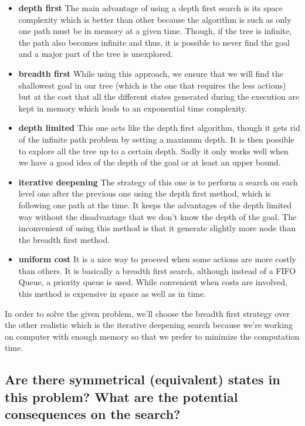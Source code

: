 \documentclass[a4paper,10pt]{article}
\begin{document}
	\begin{itemize}
		\item \textbf{depth first} The main advantage of using a depth first search is its space complexity which is better than other because the algorithm is such as only one path must be in memory at a given time. 
		Though, if the tree is infinite, the path also becomes infinite and thus, it is possible to never find the goal and a major part of the tree is unexplored.
		\item \textbf{breadth first} While using this approach, we ensure that we will find the shallowest goal in our tree (which is the one that requires the less actions) but at the cost that all the different states generated during the execution are kept in memory which leads to an exponential time complexity.
		\item \textbf{depth limited} This one acts like the depth first algorithm, though it gets rid of the infinite path problem by setting a maximum depth. It is then possible to explore all the tree up to a certain depth. 
		Sadly it only works well when we have a good idea of the depth of the goal or at least an upper bound.
		\item \textbf{iterative deepening} The strategy of this one is to perform a search on each level one after the previous one using the depth first method, which is following one path at the time. It keeps the advantages of the depth limited way without the disadvantage that we don't know the depth of the goal.
		The inconvenient of using this method is that it generate slightly more node than the breadth first method.
		\item \textbf{uniform cost} It is a nice way to proceed when some actions are more costly than others. It is basically a breadth first search, although instead of a FIFO Queue, a priority queue is used.
		While convenient when costs are involved, this method is expensive in space as well as in time.\\
	\end{itemize}
	In order to solve the given problem, we'll choose the breadth first strategy over the other realistic which is the iterative deepening search because we're working on computer with enough memory so that we prefer to minimize the computation time.
	
	\subsection{Are there symmetrical (equivalent) states in this problem? What are the potential consequences on the search?}
	
\end{document}

